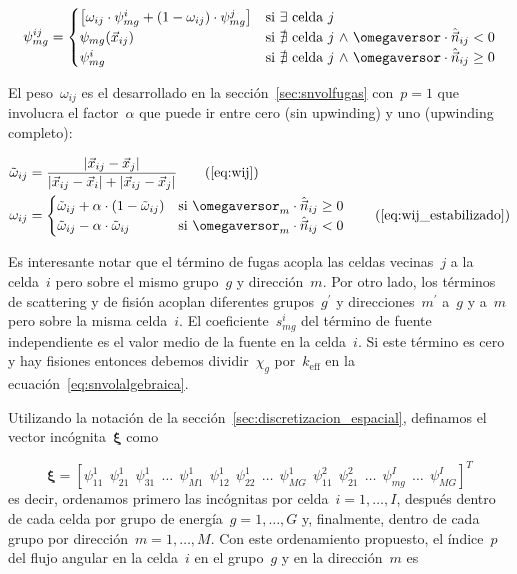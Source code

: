 \begin{equation*}
\psi_{mg}^{ij} =
\begin{cases}
\left[ \omega_{ij} \cdot \psi_{mg}^i + (1-\omega_{ij}) \cdot \psi_{mg}^j \right] & \text{si~$\exists$ celda~$j$} \\
\psi_{mg}(\vec{x}_{ij}) & \text{si~$\nexists$ celda~$j$ $\wedge$ $\omegaversor \cdot \hat{\vec{n}}_{ij} < 0$} \\
\psi_{mg}^i             & \text{si~$\nexists$ celda~$j$ $\wedge$ $\omegaversor \cdot \hat{\vec{n}}_{ij} \geq 0$} \\
\end{cases}
\end{equation*}

El peso~$\omega_{ij}$ es el desarrollado en la sección~\ref{sec:snvolfugas} con~$p=1$ que involucra el factor~$\alpha$ que puede ir entre cero (sin upwinding) y uno (upwinding completo):

\begin{align*}
\tilde{\omega}_{ij} &= \frac{|\vec{x}_{ij} - \vec{x}_j|}{|\vec{x}_{ij} - \vec{x}_i| + |\vec{x}_{ij} - \vec{x}_j|} \tag{\ref{eq:wij}} \\
 \omega_{ij} &=
\begin{cases}
 \tilde{\omega}_{ij} + \alpha \cdot (1 - \tilde{\omega}_{ij}) & \text{si $\omegaversor_m \cdot \hat{\vec{n}}_{ij} \ge 0$}\\
 \tilde{\omega}_{ij} - \alpha \cdot \tilde{\omega}_{ij}       & \text{si $\omegaversor_m \cdot \hat{\vec{n}}_{ij} < 0$}\\
\end{cases}
\tag{\ref{eq:wij_estabilizado}}
\end{align*}
 

Es interesante notar que el término de fugas acopla las celdas vecinas~$j$ a la celda~$i$ pero sobre el mismo grupo~$g$ y dirección~$m$. Por otro lado, los términos de scattering y de fisión acoplan diferentes grupos~$g^\prime$ y direcciones~$m^\prime$ a~$g$ y a~$m$ pero sobre la misma celda~$i$. El coeficiente~$s_{mg}^i$ del término de fuente independiente es el valor medio de la fuente en la celda~$i$. Si este término es cero y hay fisiones entonces debemos dividir~$\chi_g$ por~$k_\text{eff}$ en la ecuación~\eqref{eq:snvolalgebraica}.

\medskip

Utilizando la notación de la sección~\ref{sec:discretizacion_espacial}, definamos el vector incógnita~$\boldsymbol{\xi}$ como

\begin{equation*}
\boldsymbol{\xi} =
\left[
\psi_{1 1}^{1} ~~
\psi_{2 1}^{1} ~~
\psi_{3 1}^{1} ~~
\dots          ~~
\psi_{M 1}^{1} ~~
\psi_{1 2}^{1} ~~
\psi_{2 2}^{1} ~~
\dots          ~~
\psi_{M G}^{1} ~~
\psi_{1 1}^{2} ~~
\psi_{2 1}^{2} ~~
\dots          ~~
\psi_{m g}^{I} ~~
\dots          ~~
\psi_{M G}^{I}
\right]^T
\end{equation*}%
%
es decir, ordenamos primero las incógnitas por celda~$i=1,\dots,I$, después dentro de cada celda por grupo de energía~$g=1,\dots,G$ y, finalmente, dentro de cada grupo por dirección~$m=1,\dots,M$. Con este ordenamiento propuesto, el índice~$p$ del flujo angular en la celda~$i$ en el grupo~$g$ y en la dirección~$m$ es

